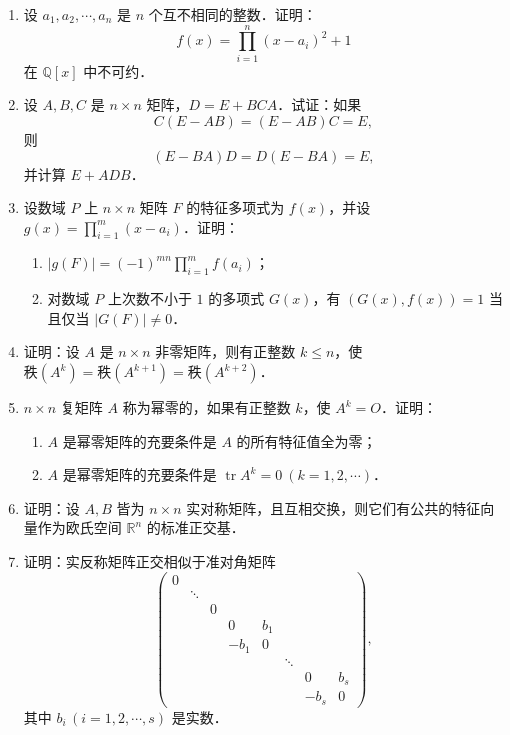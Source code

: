 \begin{enumerate}
  \ansproof
  \item 设 $a_1,a_2,\cdots,a_n$ 是 $n$ 个互不相同的整数．证明：
  \[
    f(x)=\prod_{i=1}^n (x-a_i)^2+1
  \]
  在 $\mathbb{Q}[x]$ 中不可约．

  \ansproof
  \item 设 $A,B,C$ 是 $n\times n$ 矩阵，$D=E+BCA$．试证：如果
  \[
    C(E-AB)=(E-AB)C=E,
  \]
  则
  \[
    (E-BA)D=D(E-BA)=E,
  \]
  并计算 $E+ADB$．

  \ansproof
  \item 设数域 $P$ 上 $n\times n$ 矩阵 $F$ 的特征多项式为 $f(x)$，并设 $g(x)=\prod_{i=1}^m (x-a_i)$．证明：
  \begin{enumerate}
    \item $|g(F)|=(-1)^{mn}\prod_{i=1}^m f(a_i)$；
  \anssub
    \item 对数域 $P$ 上次数不小于 $1$ 的多项式 $G(x)$，有 $(G(x),f(x))=1$ 当且仅当 $|G(F)|\neq 0$．
  \anssub
  \end{enumerate}

  \item 证明：设 $A$ 是 $n\times n$ 非零矩阵，则有正整数 $k\leq n$，使 $\text{秩}(A^k)=\text{秩}(A^{k+1})=\text{秩}(A^{k+2})$．

  \ansproof
  \item $n\times n$ 复矩阵 $A$ 称为幂零的，如果有正整数 $k$，使 $A^k=O$．证明：
  \begin{enumerate}
    \item $A$ 是幂零矩阵的充要条件是 $A$ 的所有特征值全为零；
  \anssub
    \item $A$ 是幂零矩阵的充要条件是 $\operatorname{tr}A^k=0\ (k=1,2,\cdots)$．
  \anssub
  \end{enumerate}

  \item 证明：设 $A,B$ 皆为 $n\times n$ 实对称矩阵，且互相交换，则它们有公共的特征向量作为欧氏空间 $\mathbb{R}^n$ 的标准正交基．

  \ansproof
  \item 证明：实反称矩阵正交相似于准对角矩阵
  \[
    \begin{pmatrix}
      0 & & & & & & & \\
       & \ddots & & & & & & \\
       & & 0 & & & & & \\
       & & & 0 & b_1 & & & \\
       & & & -b_1 & 0 & & & \\
       & & & & & \ddots & & \\
       & & & & & & 0 & b_s\\
       & & & & & & -b_s & 0
    \end{pmatrix},
  \]
  其中 $b_i\,(i=1,2,\cdots,s)$ 是实数．


\end{enumerate}
